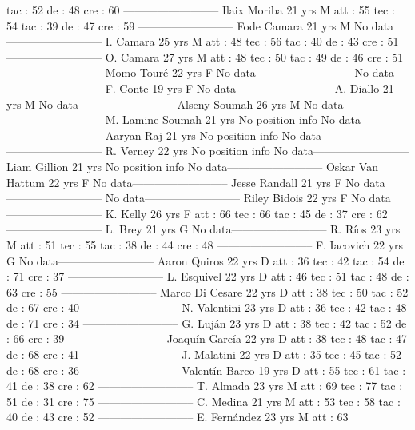  tac : 52 
 de : 48 
 cre : 60 
--------------------------
Ilaix Moriba  21 yrs 
M 
 att : 55 
 tec : 54 
 tac : 39 
 de : 47 
 cre : 59 
--------------------------
Fode Camara  21 yrs 
M 
No data--------------------------
I. Camara  25 yrs 
M 
 att : 48 
 tec : 56 
 tac : 40 
 de : 43 
 cre : 51 
--------------------------
O. Camara  27 yrs 
M 
 att : 48 
 tec : 50 
 tac : 49 
 de : 46 
 cre : 51 
--------------------------
Momo Touré  22 yrs 
F 
No data--------------------------
No data--------------------------
F. Conte  19 yrs 
F 
No data--------------------------
A. Diallo  21 yrs 
M 
No data--------------------------
Alseny Soumah  26 yrs 
M 
No data--------------------------
M. Lamine Soumah  21 yrs 
No position info 
No data--------------------------
Aaryan Raj  21 yrs 
No position info 
No data--------------------------
R. Verney  22 yrs 
No position info 
No data--------------------------
Liam Gillion  21 yrs 
No position info 
No data--------------------------
Oskar Van Hattum  22 yrs 
F 
No data--------------------------
Jesse Randall  21 yrs 
F 
No data--------------------------
No data--------------------------
Riley Bidois  22 yrs 
F 
No data--------------------------
K. Kelly  26 yrs 
F 
 att : 66 
 tec : 66 
 tac : 45 
 de : 37 
 cre : 62 
--------------------------
L. Brey  21 yrs 
G 
No data--------------------------
R. Ríos  23 yrs 
M 
 att : 51 
 tec : 55 
 tac : 38 
 de : 44 
 cre : 48 
--------------------------
F. Iacovich  22 yrs 
G 
No data--------------------------
Aaron Quiros  22 yrs 
D 
 att : 36 
 tec : 42 
 tac : 54 
 de : 71 
 cre : 37 
--------------------------
L. Esquivel  22 yrs 
D 
 att : 46 
 tec : 51 
 tac : 48 
 de : 63 
 cre : 55 
--------------------------
Marco Di Cesare  22 yrs 
D 
 att : 38 
 tec : 50 
 tac : 52 
 de : 67 
 cre : 40 
--------------------------
N. Valentini  23 yrs 
D 
 att : 36 
 tec : 42 
 tac : 48 
 de : 71 
 cre : 34 
--------------------------
G. Luján  23 yrs 
D 
 att : 38 
 tec : 42 
 tac : 52 
 de : 66 
 cre : 39 
--------------------------
Joaquín García  22 yrs 
D 
 att : 38 
 tec : 48 
 tac : 47 
 de : 68 
 cre : 41 
--------------------------
J. Malatini  22 yrs 
D 
 att : 35 
 tec : 45 
 tac : 52 
 de : 68 
 cre : 36 
--------------------------
Valentín Barco  19 yrs 
D 
 att : 55 
 tec : 61 
 tac : 41 
 de : 38 
 cre : 62 
--------------------------
T. Almada  23 yrs 
M 
 att : 69 
 tec : 77 
 tac : 51 
 de : 31 
 cre : 75 
--------------------------
C. Medina  21 yrs 
M 
 att : 53 
 tec : 58 
 tac : 40 
 de : 43 
 cre : 52 
--------------------------
E. Fernández  23 yrs 
M 
 att : 63 
